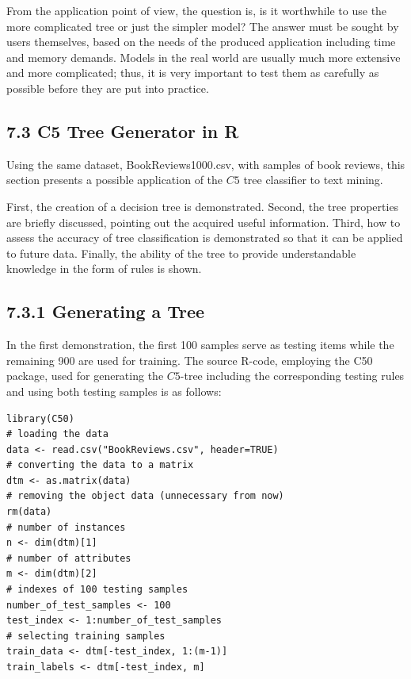 \documentclass[10pt]{book}
\begin{document}
From the application point of view, the question is, is it worthwhile to use the more complicated tree or just the simpler model? The answer must be sought by users themselves, based on the needs of the produced application including time and memory demands. Models in the real world are usually much more extensive and more complicated; thus, it is very important to test them as carefully as possible before they are put into practice.

\subsection*{7.3 C5 Tree Generator in R}
Using the same dataset, BookReviews1000.csv, with samples of book reviews, this section presents a possible application of the $C 5$ tree classifier to text mining.

First, the creation of a decision tree is demonstrated. Second, the tree properties are briefly discussed, pointing out the acquired useful information. Third, how to assess the accuracy of tree classification is demonstrated so that it can be applied to future data. Finally, the ability of the tree to provide understandable knowledge in the form of rules is shown.

\subsection*{7.3.1 Generating a Tree}
In the first demonstration, the first 100 samples serve as testing items while the remaining 900 are used for training. The source R-code, employing the C50 package, used for generating the $C 5$-tree including the corresponding testing rules and using both testing samples is as follows:

\begin{verbatim}
library(C50)
# loading the data
data <- read.csv("BookReviews.csv", header=TRUE)
# converting the data to a matrix
dtm <- as.matrix(data)
# removing the object data (unnecessary from now)
rm(data)
# number of instances
n <- dim(dtm)[1]
# number of attributes
m <- dim(dtm)[2]
# indexes of 100 testing samples
number_of_test_samples <- 100
test_index <- 1:number_of_test_samples
# selecting training samples
train_data <- dtm[-test_index, 1:(m-1)]
train_labels <- dtm[-test_index, m]
\end{verbatim}
\end{document}
